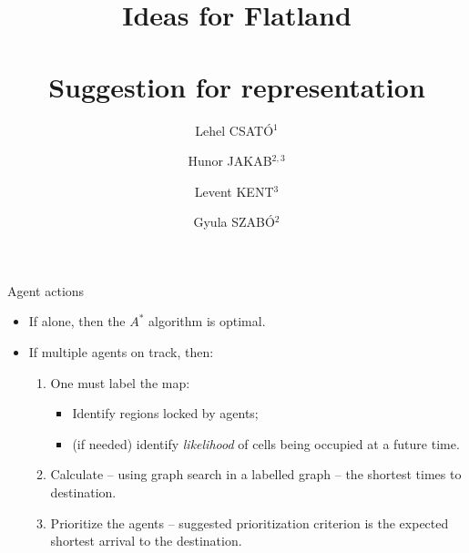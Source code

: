 \documentclass[aspectratio=169,12pt]{beamer}
\title[Flatland]{
	\large Ideas for Flatland\\
	~\\
	\small Suggestion  for representation
}
\author{Lehel CSATÓ$^1$ \and Hunor JAKAB$^{2,3}$ \and Levent KENT$^3$ \and Gyula SZABÓ$^2$}
\institute[UBB]{%
  $^1$Faculty of Mathematics and Informatics, 
  Babe\c{s}--Bolyai University of Cluj-Napoca  \\
  $^2$Accenture Romania \\
  $^3$Accenture Switzerland \\
}
\begin{document}
\frame{\maketitle}


\begin{frame}[t]{Agent actions}


\begin{itemize}
\item If alone, then the $A^*$ algorithm is optimal.
\vfill
\vfill
\item If multiple agents on track, then:
\vfill
  \begin{enumerate}
  \item One must label the \alert{map}: 
    \begin{itemize}
    \item Identify regions locked by agents;
    \item (if needed) identify \emph{likelihood} of cells being occupied at a future time.
    \end{itemize}
\vfill
  \item Calculate -- using graph search in a labelled graph -- the shortest times to destination.
\vfill
  \item Prioritize the agents -- suggested prioritization criterion is the \alert{expected shortest arrival} to the destination.
  \end{enumerate}

\end{itemize}

\vfill

\hfill {}
\vspace*{-0cm}
\end{frame}
\end{document}
